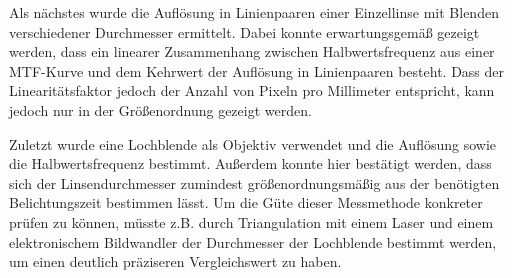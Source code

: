 \documentclass[
	a4paper,
	12pt,
	pagesize,
	ngerman
]{scrartcl}
\begin{document}
	Als nächstes wurde die Auflösung in Linienpaaren einer Einzellinse mit Blenden verschiedener Durchmesser ermittelt.
	Dabei konnte erwartungsgemäß gezeigt werden, dass ein linearer Zusammenhang zwischen Halbwertsfrequenz aus einer MTF-Kurve und dem Kehrwert der Auflösung in Linienpaaren besteht.
	Dass der Linearitätsfaktor jedoch der Anzahl von Pixeln pro Millimeter entspricht, kann jedoch nur in der Größenordnung gezeigt werden.
	
	Zuletzt wurde eine Lochblende als Objektiv verwendet und die Auflösung sowie die Halbwertsfrequenz bestimmt.
	Außerdem konnte hier bestätigt werden, dass sich der Linsendurchmesser zumindest größenordnungsmäßig aus der benötigten Belichtungszeit bestimmen lässt.
	Um die Güte dieser Messmethode konkreter prüfen zu können, müsste z.B. durch Triangulation mit einem Laser und einem elektronischem Bildwandler der Durchmesser der Lochblende bestimmt werden, um einen deutlich präziseren Vergleichswert zu haben.
	
	\printbibliography
\end{document}
